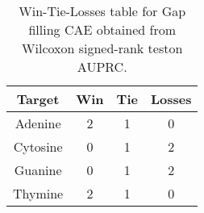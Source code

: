 \begin{table}[H]
\centering
\begin{tabular}{|c|c|c|c|}

\textbf{Target} &  \textbf{Win} &  \textbf{Tie} &  \textbf{Losses} \\
\hline

        Adenine &             2 &             1 &                0 \\
\hline
       Cytosine &             0 &             1 &                2 \\
\hline
        Guanine &             0 &             1 &                2 \\
\hline
        Thymine &             2 &             1 &                0 \\
\hline

\end{tabular}
\caption{Win-Tie-Losses table for Gap filling CAE obtained from Wilcoxon signed-rank teston AUPRC.}
\label{tab:gap_filling_cae_nucleotides_comparison}
\end{table}